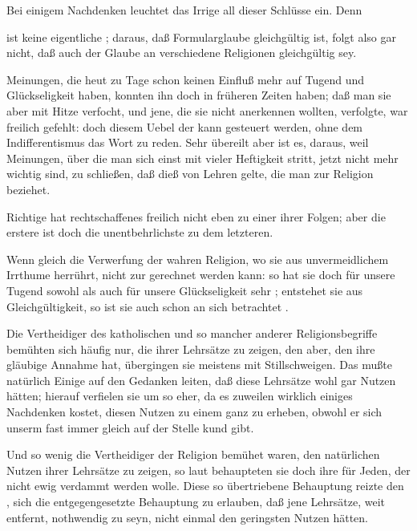 \begin{aufza}
\begin{RWanm}
Bei einigem Nachdenken leuchtet das Irrige all dieser Schlüsse ein. Denn
\begin{aufzb} 
\item {} ist keine eigentliche ; daraus, daß Formularglaube gleichgültig ist, folgt also gar nicht, daß auch der Glaube an verschiedene Religionen gleichgültig sey.
\item Meinungen, die heut zu Tage schon keinen Einfluß mehr auf Tugend und Glückseligkeit haben, konnten ihn doch in früheren Zeiten haben; daß man sie aber mit Hitze verfocht, und jene, die sie nicht anerkennen wollten, verfolgte, war freilich gefehlt: doch diesem Uebel der  kann gesteuert werden, ohne dem Indifferentismus das Wort zu reden. Sehr übereilt aber ist es, daraus, weil  Meinungen, über die man sich einst mit vieler Heftigkeit stritt, jetzt nicht mehr wichtig sind, zu schließen, daß dieß von  Lehren gelte, die man zur Religion beziehet.
\item Richtige  hat rechtschaffenes  freilich nicht eben zu einer ihrer  Folgen; aber die erstere ist doch die unentbehrlichste  zu dem letzteren.
\item Wenn gleich die Verwerfung der wahren Religion, wo sie aus unvermeidlichem Irrthume herrührt, nicht  zur  gerechnet werden kann: so hat sie doch für unsere Tugend sowohl als auch für unsere Glückseligkeit sehr ; entstehet sie aus Gleichgültigkeit, so ist sie auch schon an sich betrachtet .
\end{aufzb}
\end{RWanm}
\item Die Vertheidiger des katholischen und so mancher anderer Religionsbegriffe bemühten sich häufig nur, die  ihrer Lehrsätze zu zeigen, den  aber, den ihre gläubige Annahme hat, übergingen sie meistens mit Stillschweigen. Das mußte natürlich Einige auf den Gedanken leiten, daß diese Lehrsätze wohl gar  Nutzen hätten; hierauf verfielen sie um so eher, da es zuweilen wirklich einiges Nachdenken kostet, diesen Nutzen zu einem ganz  zu erheben, obwohl er sich unserm  fast immer gleich auf der Stelle kund gibt.
\item Und so wenig die Vertheidiger der Religion bemühet waren, den natürlichen Nutzen ihrer Lehrsätze zu zeigen, so laut behaupteten sie doch ihre  für Jeden, der nicht ewig verdammt werden wolle. Diese so übertriebene Behauptung reizte den , sich die entgegengesetzte Behauptung zu erlauben, daß jene Lehrsätze, weit entfernt, nothwendig zu seyn, nicht einmal den geringsten Nutzen hätten.

\end{aufza}
